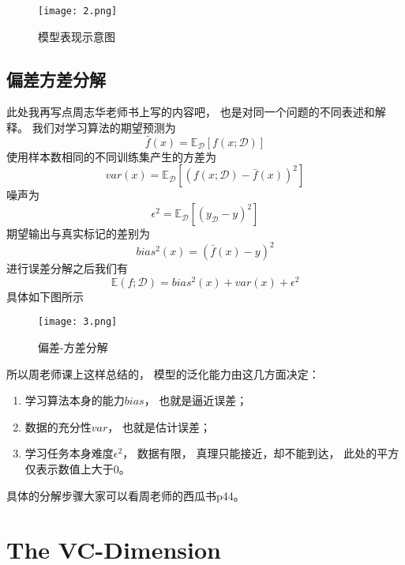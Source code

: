 \documentclass[UTF8]{ctexart}
\begin{document}
\begin{figure}[htbp]
\centering
\texttt{[image: 2.png]}
\caption{模型表现示意图}
\end{figure}


\subsection{偏差方差分解}
此处我再写点周志华老师书上写的内容吧，
也是对同一个问题的不同表述和解释。
我们对学习算法的期望预测为
$$
\bar{f}(x)=\mathbb{E}_{\mathcal{D}}[f(x;\mathcal{D})]
$$
使用样本数相同的不同训练集产生的方差为
$$
var(x)=\mathbb{E}_{\mathcal{D}}[(f(x;\mathcal{D})-\bar{f}(x))^2]
$$
噪声为
$$
\epsilon^2=\mathbb{E}_{\mathcal{D}}[(y_{\mathcal{D}}-y)^2]
$$
期望输出与真实标记的差别为
$$
bias^2(x)=(\bar{f}(x)-y)^2
$$
进行误差分解之后我们有
$$
\mathbb{E}(f;\mathcal{D})=
bias^2(x)+var(x)+\epsilon^2
$$
具体如下图所示

\begin{figure}[htbp]
\centering
\texttt{[image: 3.png]}
\caption{偏差-方差分解}
\end{figure}

所以周老师课上这样总结的，
模型的泛化能力由这几方面决定：
\begin{enumerate}
\item
学习算法本身的能力$bias$，
也就是逼近误差；
\item
数据的充分性$var$，
也就是估计误差；
\item
学习任务本身难度$\epsilon^2$，
数据有限，
真理只能接近，却不能到达，
此处的平方仅表示数值上大于$0$。
\end{enumerate}

具体的分解步骤大家可以看周老师的西瓜书p44。
















\newpage




%
%
\section{The VC-Dimension}


\newpage
\end{document}
